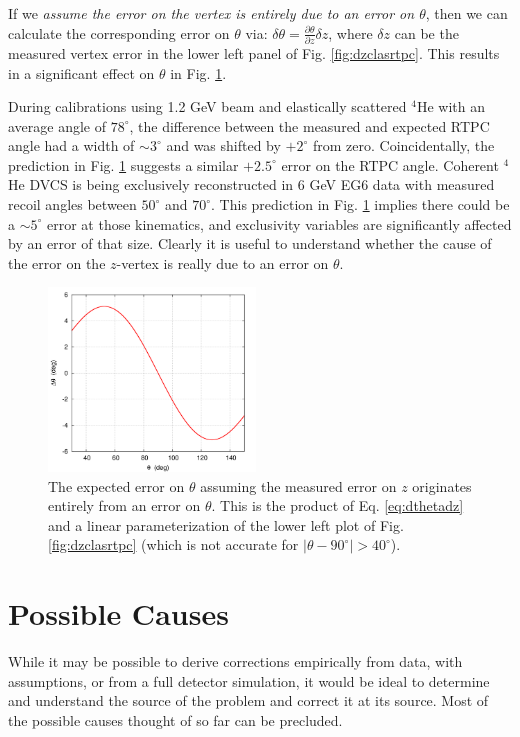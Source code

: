 \documentclass[amsmath,amssymb,notitlepage,11pt]{revtex4-1}
\begin{document}
If we {\it assume the error on the vertex is entirely due to an error on $\theta$}, then we can calculate the corresponding error on $\theta$ via: $\delta\theta=\frac{\partial\theta}{\partial z}\delta z$,  where $\delta z$ can be the measured vertex error in the lower left panel of Fig. \ref{fig:dzclasrtpc}.  This results in a significant effect on $\theta$ in Fig. \ref{fig:dtheta1}.

During calibrations using 1.2 GeV beam and elastically scattered $^4$He with an average angle of $78^\circ$, the difference between the measured and expected RTPC angle had a width of $\sim3^\circ$ and was shifted by $+2^\circ$ from zero.  Coincidentally, the prediction in Fig. \ref{fig:dtheta1} suggests a similar $+2.5^\circ$ error on the RTPC angle.  
Coherent $^4$He DVCS is being exclusively reconstructed in 6 GeV EG6 data with measured recoil angles between $50^\circ$ and $70^\circ$.  This prediction in Fig. \ref{fig:dtheta1} implies there could be a $\sim5^\circ$ error at those kinematics, and exclusivity variables are significantly affected by an error of that size.
Clearly it is useful to understand whether the cause of the error on the $z$-vertex is really due to an error on $\theta$.
\begin{figure}[htbp]\centering
    \includegraphics[width=0.49\textwidth]{pics/dtheta1.png}
    \caption{The expected error on $\theta$ assuming the measured error on $z$ originates entirely from an error on $\theta$.  This is the product of Eq. \ref{eq:dthetadz} and a linear parameterization of the lower left plot of Fig. \ref{fig:dzclasrtpc} (which is not accurate for $\left|\theta-90^\circ\right|>40^\circ$).\label{fig:dtheta1}}
\end{figure}
\section{Possible Causes}
While it may be possible to derive corrections empirically from data, with assumptions, or from a full detector simulation, it would be ideal to determine and understand the source of the problem and correct it at its source.
Most of the possible causes thought of so far can be precluded.
\end{document}
